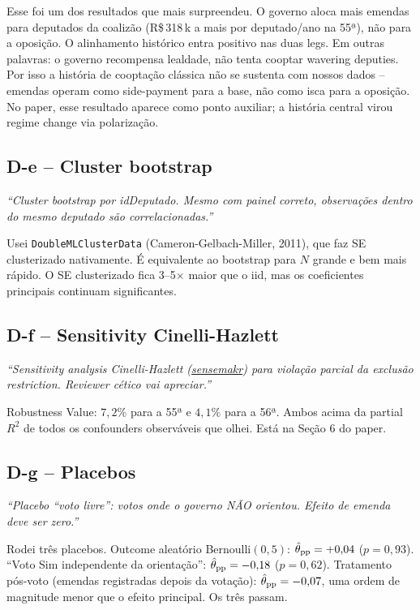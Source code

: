 \documentclass[11pt,a4paper]{article}
\newcommand{\pedido}[1]{\par\medskip\noindent\textit{\textcolor{quotegray}{#1}}\par\smallskip}
\begin{document}
Esse foi um dos resultados que mais surpreendeu. O governo aloca mais emendas para deputados da coalizão (R\$\,318\,k a mais por deputado/ano na 55ª), não para a oposição. O alinhamento histórico entra positivo nas duas legs. Em outras palavras: o governo recompensa lealdade, não tenta cooptar wavering deputies. Por isso a história de cooptação clássica não se sustenta com nossos dados -- emendas operam como side-payment para a base, não como isca para a oposição. No paper, esse resultado aparece como ponto auxiliar; a história central virou regime change via polarização.

\subsection*{D-e -- Cluster bootstrap}

\pedido{``Cluster bootstrap por idDeputado. Mesmo com painel correto, observações dentro do mesmo deputado são correlacionadas.''}

Usei \texttt{DoubleMLClusterData} (Cameron-Gelbach-Miller, 2011), que faz SE clusterizado nativamente. É equivalente ao bootstrap para $N$ grande e bem mais rápido. O SE clusterizado fica 3--5$\times$ maior que o iid, mas os coeficientes principais continuam significantes.

\subsection*{D-f -- Sensitivity Cinelli-Hazlett}

\pedido{``Sensitivity analysis Cinelli-Hazlett (\href{https://carloscinelli.com/sensemakr/}{sensemakr}) para violação parcial da exclusão restriction. Reviewer cético vai apreciar.''}

Robustness Value: $7{,}2\%$ para a 55ª e $4{,}1\%$ para a 56ª. Ambos acima da partial $R^2$ de todos os confounders observáveis que olhei. Está na Seção 6 do paper.

\subsection*{D-g -- Placebos}

\pedido{``Placebo ``voto livre'': votos onde o governo NÃO orientou. Efeito de emenda deve ser zero.''}

Rodei três placebos. Outcome aleatório Bernoulli$(0{,}5)$: $\hat\theta_{\rm pp}=+0{,}04$ ($p=0{,}93$). ``Voto Sim independente da orientação'': $\hat\theta_{\rm pp}=-0{,}18$ ($p=0{,}62$). Tratamento pós-voto (emendas registradas depois da votação): $\hat\theta_{\rm pp}=-0{,}07$, uma ordem de magnitude menor que o efeito principal. Os três passam.
\end{document}
